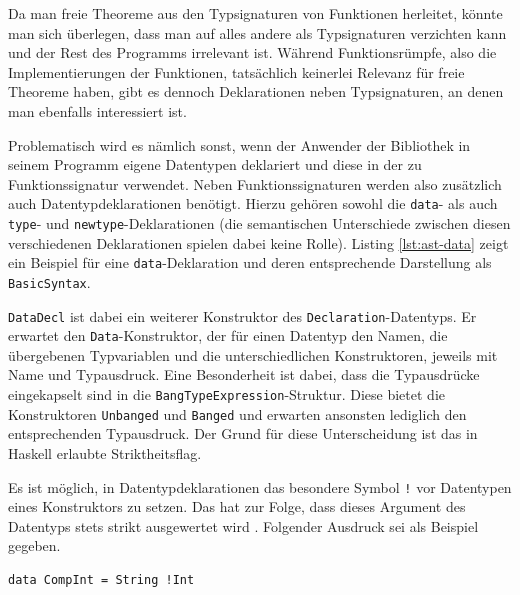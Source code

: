 Da man freie Theoreme aus den Typsignaturen von Funktionen herleitet, könnte man sich überlegen, dass man auf alles andere
als Typsignaturen verzichten kann und der Rest des Programms irrelevant ist. Während Funktionsrümpfe, also die Implementierungen
der Funktionen, tatsächlich keinerlei Relevanz für freie Theoreme haben, gibt es dennoch Deklarationen neben Typsignaturen, an
denen man ebenfalls interessiert ist.


Problematisch wird es nämlich sonst, wenn der Anwender der Bibliothek in seinem Programm eigene Datentypen deklariert und
diese in der zu Funktionssignatur verwendet. Neben Funktionssignaturen werden also zusätzlich auch Datentypdeklarationen
benötigt.
Hierzu gehören sowohl die \texttt{data}- als auch \texttt{type}- und \texttt{newtype}-Deklarationen (die semantischen Unterschiede
zwischen diesen verschiedenen Deklarationen spielen dabei keine Rolle). Listing \ref{lst:ast-data} zeigt ein Beispiel für eine
\texttt{data}-Deklaration und deren entsprechende Darstellung als \texttt{BasicSyntax}.

\texttt{DataDecl} ist dabei ein weiterer Konstruktor des \texttt{Declaration}-Datentyps. Er erwartet den \texttt{Data}-Konstruktor,
der für einen Datentyp den Namen, die übergebenen Typvariablen und die unterschiedlichen Konstruktoren, jeweils mit Name
und Typausdruck. Eine Besonderheit ist dabei, dass die Typausdrücke eingekapselt sind in die \texttt{BangTypeExpression}-Struktur.
Diese bietet die Konstruktoren \texttt{Unbanged} und \texttt{Banged} und erwarten ansonsten lediglich den entsprechenden
Typausdruck. Der Grund für diese Unterscheidung ist das in Haskell erlaubte Striktheitsflag.

Es ist möglich, in Datentypdeklarationen das besondere Symbol \texttt{!} vor Datentypen eines Konstruktors zu setzen. Das hat
zur Folge, dass dieses Argument des Datentyps stets strikt ausgewertet wird \cite{haskell}. Folgender Ausdruck sei als Beispiel
gegeben.

\begin{verbatim}
data CompInt = String !Int
\end{verbatim}

